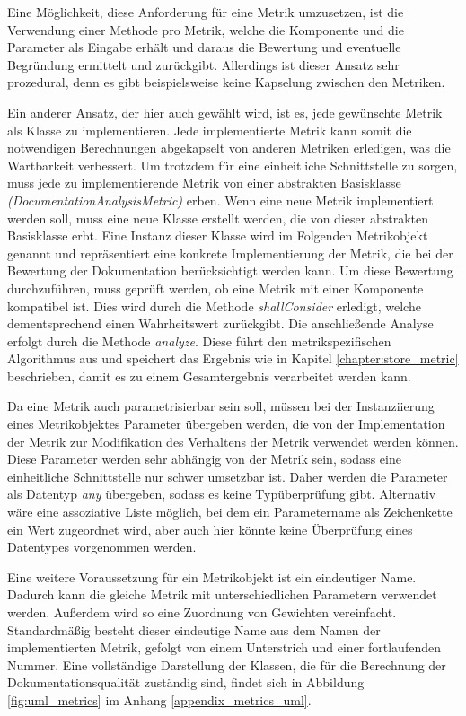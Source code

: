 Eine Möglichkeit, diese Anforderung für eine Metrik umzusetzen, ist die Verwendung einer Methode pro Metrik, welche die Komponente und die Parameter als Eingabe erhält und daraus die Bewertung und eventuelle Begründung ermittelt und zurückgibt. Allerdings ist dieser Ansatz sehr prozedural, denn es gibt beispielsweise keine Kapselung zwischen den Metriken.  

Ein anderer Ansatz, der hier auch gewählt wird, ist es, jede gewünschte Metrik als Klasse zu implementieren. Jede implementierte Metrik kann somit die notwendigen Berechnungen abgekapselt von anderen Metriken erledigen, was die Wartbarkeit verbessert. Um trotzdem für eine einheitliche Schnittstelle zu sorgen, muss jede zu implementierende Metrik von einer abstrakten Basisklasse \textit{(DocumentationAnalysisMetric)} erben. Wenn eine neue Metrik implementiert werden soll, muss eine neue Klasse erstellt werden, die von dieser abstrakten Basisklasse erbt. Eine Instanz dieser Klasse wird im Folgenden Metrikobjekt genannt und repräsentiert eine konkrete Implementierung der Metrik, die bei der Bewertung der Dokumentation berücksichtigt werden kann. Um diese Bewertung durchzuführen, muss geprüft werden, ob eine Metrik mit einer Komponente kompatibel ist. Dies wird durch die  Methode \textit{shallConsider} erledigt,  welche dementsprechend einen Wahrheitswert zurückgibt. Die anschließende Analyse erfolgt durch die Methode \textit{analyze}. Diese führt den metrikspezifischen Algorithmus aus und speichert das Ergebnis wie in Kapitel \ref{chapter:store_metric} beschrieben, damit es zu einem Gesamtergebnis verarbeitet werden kann.

Da eine Metrik auch parametrisierbar sein soll, müssen bei der Instanziierung  eines Metrikobjektes Parameter übergeben werden, die von der Implementation der Metrik zur Modifikation des Verhaltens der Metrik verwendet werden können. Diese Parameter werden sehr abhängig von der Metrik sein, sodass eine einheitliche Schnittstelle nur schwer umsetzbar ist. Daher werden die Parameter als Datentyp \textit{any} übergeben, sodass es keine Typüberprüfung gibt. Alternativ wäre eine assoziative Liste möglich, bei dem ein Parametername als Zeichenkette ein Wert zugeordnet wird, aber auch hier könnte keine Überprüfung eines Datentypes vorgenommen werden. 

Eine  weitere Voraussetzung für ein Metrikobjekt ist ein eindeutiger Name. Dadurch kann die gleiche Metrik mit unterschiedlichen Parametern verwendet werden. Außerdem wird so eine Zuordnung von Gewichten vereinfacht. Standardmäßig besteht dieser eindeutige Name aus dem Namen der implementierten Metrik, gefolgt von einem Unterstrich und einer fortlaufenden Nummer. Eine vollständige Darstellung der Klassen, die für die Berechnung der Dokumentationsqualität zuständig sind, findet sich in Abbildung \ref{fig:uml_metrics} im Anhang \ref{appendix_metrics_uml}.


